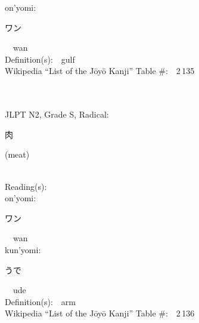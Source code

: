 \begin{multicols}{2}
{\hspace*{1em}}on'yomi:\ \ \\
{\hspace*{2em}}{\begin{CJK}{UTF8}{min} ワン \end{CJK}}\ \ wan\ \ \\
Definition(s):\ \ gulf \\
Wikipedia ``List of the J\=oy\=o Kanji'' Table \#:\ \ 2\,135 \\
\ \ \\
{\fontsize{34pt}{40pt}  }\ \ \\  %
{JLPT N2, Grade S, Radical:\ \ {\begin{CJK}{UTF8}{min} 肉 \end{CJK}} (meat) } \\
Reading(s):\ \ \\
{\hspace*{1em}}on'yomi:\ \ \\
{\hspace*{2em}}{\begin{CJK}{UTF8}{min} ワン \end{CJK}}\ \ wan\ \ \\
{\hspace*{1em}}kun'yomi:\ \ \\
{\hspace*{2em}}{\begin{CJK}{UTF8}{min} うで \end{CJK}}\ \ ude\ \ \\
Definition(s):\ \ arm \\
Wikipedia ``List of the J\=oy\=o Kanji'' Table \#:\ \ 2\,136 \\
\ \ \\
\end{multicols}

\newpage


